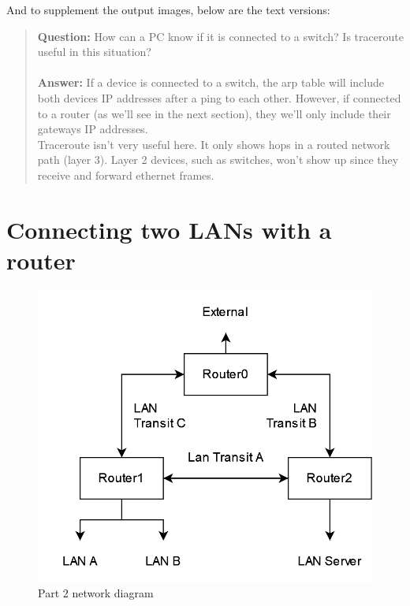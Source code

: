 \documentclass[11pt,a4paper]{report}
\begin{document}
        And to supplement the output images, below are the text versions:
        \lstset{style=termoutputs}
        
        

        \begin{quote}
            \textbf{Question:} How can a PC know if it is connected to a switch? Is traceroute useful in this situation? \\
            \\
            \textbf{Answer:}
            If a device is connected to a switch, the arp table will include both devices IP addresses after a ping to each other. However, if connected to a router (as we'll see in the next section), they we'll only include their gateways IP addresses.\\
            Traceroute isn't very useful here. It only shows hops in a routed network path (layer 3). Layer 2 devices, such as switches, won't show up since they receive and forward ethernet frames.\\
        \end{quote}

    \section{Connecting two LANs with a router}
        \begin{figure}[h]
            \centering
            \includegraphics[scale=0.40,valign=c]{diagramL250}
            \caption{Part 2 network diagram}
            \label{fig:p2netdiag}
        \end{figure}
\end{document}
